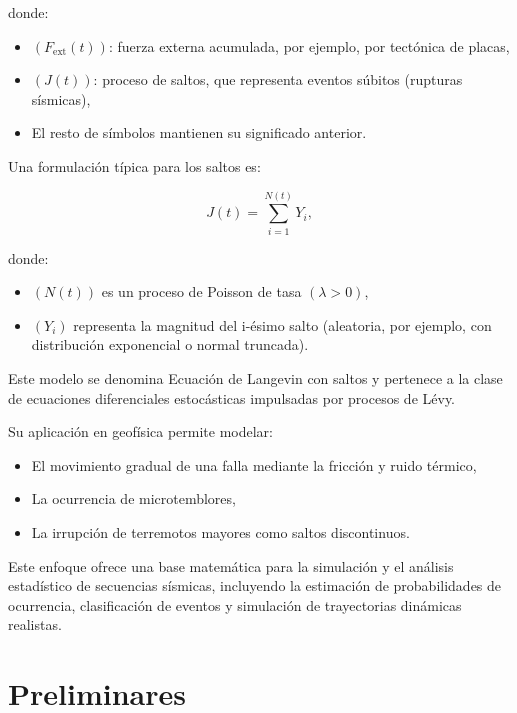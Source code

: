 \documentclass[
  spanish,
  us-letterpaper,
]{scrreprt}
\providecommand{\tightlist}{%
  \setlength{\itemsep}{0pt}\setlength{\parskip}{0pt}}
\theoremstyle{plain}
\theoremstyle{plain}
\theoremstyle{plain}
\theoremstyle{definition}
\theoremstyle{remark}
\begin{document}
donde:

\begin{itemize}
\tightlist
\item
  \(( F_{\text{ext}}(t) )\): fuerza externa acumulada, por ejemplo, por
  tectónica de placas,
\item
  \(( J(t) )\): proceso de saltos, que representa eventos súbitos
  (rupturas sísmicas),
\item
  El resto de símbolos mantienen su significado anterior.
\end{itemize}

Una formulación típica para los saltos es:

\[
J(t) = \sum_{i=1}^{N(t)} Y_i,
\]

donde:

\begin{itemize}
\tightlist
\item
  \(( N(t) )\) es un proceso de Poisson de tasa \((\lambda> 0 )\),
\item
  \(( Y_i )\) representa la magnitud del i-ésimo salto (aleatoria, por
  ejemplo, con distribución exponencial o normal truncada).
\end{itemize}

Este modelo se denomina Ecuación de Langevin con saltos y pertenece a la
clase de ecuaciones diferenciales estocásticas impulsadas por procesos
de Lévy.

Su aplicación en geofísica permite modelar:

\begin{itemize}
\tightlist
\item
  El movimiento gradual de una falla mediante la fricción y ruido
  térmico,
\item
  La ocurrencia de microtemblores,
\item
  La irrupción de terremotos mayores como saltos discontinuos.
\end{itemize}

Este enfoque ofrece una base matemática para la simulación y el análisis
estadístico de secuencias sísmicas, incluyendo la estimación de
probabilidades de ocurrencia, clasificación de eventos y simulación de
trayectorias dinámicas realistas.


\chapter{Preliminares}\label{preliminares}
\end{document}
